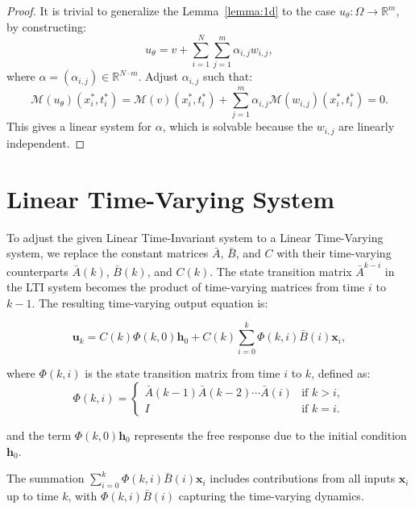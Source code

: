 \begin{proof}
    It is trivial to generalize the Lemma~\ref{lemma:1d} to the case $u_\theta : \Omega \to \mathbb{R}^m$, by constructing:
    $$
   u_\theta = v + \sum_{i=1}^N \sum_{j=1}^m \alpha_{i,j} w_{i,j},
   $$
   where $ \alpha = (\alpha_{i,j}) \in \mathbb{R}^{N \cdot m} $. Adjust $ \alpha_{i,j} $ such that:
   $$
   \mathcal{M}(u_\theta)(x_i^*, t_i^*) = \mathcal{M}(v)(x_i^*, t_i^*) + \sum_{j=1}^m \alpha_{i,j} \mathcal{M}(w_{i,j})(x_i^*, t_i^*) = 0.
   $$
   This gives a linear system for $ \alpha $, which is solvable because the $ w_{i,j} $ are linearly independent.
\end{proof}


\section{Linear Time-Varying System}
\label{apx:LTI}

To adjust the given Linear Time-Invariant system to a Linear Time-Varying system, we replace the constant matrices $ \bar{A} $, $ \bar{B} $, and $ C $ with their time-varying counterparts $ \bar{A}(k) $, $ \bar{B}(k) $, and $ C(k) $. The state transition matrix $ \bar{A}^{k-i} $ in the LTI system becomes the product of time-varying matrices from time $ i $ to $ k-1 $. The resulting time-varying output equation is:

\begin{equation}
    \mathbf{u}_k = C(k) \Phi(k, 0) \mathbf{h}_0 + C(k) \sum_{i=0}^k \Phi(k, i) \bar{B}(i) \mathbf{x}_i,
\end{equation}



where $ \Phi(k, i) $ is the state transition matrix from time $ i $ to $ k $, defined as:
\begin{equation}
      \Phi(k, i) = \begin{cases} 
    \bar{A}(k-1) \bar{A}(k-2) \cdots \bar{A}(i) & \text{if } k > i, \\
    I & \text{if } k = i.
  \end{cases}
\end{equation}


  
and the term $ \Phi(k, 0) \mathbf{h}_0 $ represents the free response due to the initial condition $ \mathbf{h}_0 $.

The summation $ \sum_{i=0}^k \Phi(k, i) \bar{B}(i) \mathbf{x}_i $ includes contributions from all inputs $ \mathbf{x}_i $ up to time $ k $, with $ \Phi(k, i) \bar{B}(i) $ capturing the time-varying dynamics.

